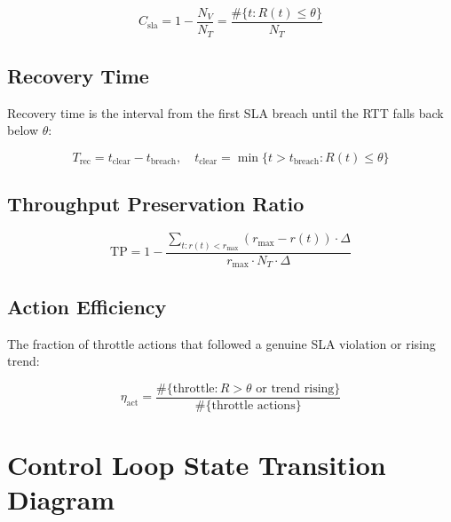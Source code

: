 \begin{equation}
C_{\text{sla}} = 1 - \frac{N_V}{N_T} = \frac{\#\{t : R(t) \leq \theta\}}{N_T}
\label{eq:sla_comp}
\end{equation}

\subsection{Recovery Time}

Recovery time is the interval from the first SLA breach until the RTT falls back below $\theta$:

\begin{equation}
T_{\text{rec}} = t_{\text{clear}} - t_{\text{breach}}, \quad t_{\text{clear}} = \min\{t > t_{\text{breach}} : R(t) \leq \theta\}
\label{eq:trec}
\end{equation}

\subsection{Throughput Preservation Ratio}

\begin{equation}
\text{TP} = 1 - \frac{\displaystyle\sum_{t: r(t) < r_{\max}} (r_{\max} - r(t)) \cdot \Delta}{\displaystyle r_{\max} \cdot N_T \cdot \Delta}
\label{eq:tp}
\end{equation}

\subsection{Action Efficiency}

The fraction of throttle actions that followed a genuine SLA violation or rising trend:

\begin{equation}
\eta_{\text{act}} = \frac{\#\{\text{throttle}: R > \theta \text{ or trend rising}\}}{\#\{\text{throttle actions}\}}
\label{eq:eff}
\end{equation}

\section{Control Loop State Transition Diagram}

